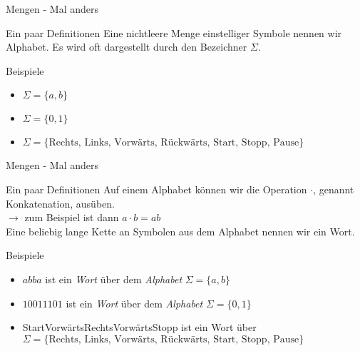 \begin{frame}{Mengen - Mal anders}
    \begin{alertblock}{Ein paar Definitionen}
    Eine nichtleere Menge einstelliger Symbole nennen wir \alert{Alphabet}.
    Es wird oft dargestellt durch den Bezeichner $\Sigma$.\\
    \end{alertblock}
    \begin{exampleblock}{Beispiele}
    \begin{itemize}
        \item $\Sigma = \{a,b\}$
        \item $\Sigma = \{0,1\}$
        \item $\Sigma = \{\text{Rechts, Links, Vorwärts, Rückwärts, Start, Stopp, Pause}\}$
    \end{itemize}
    \end{exampleblock}
\end{frame}

\begin{frame}[fragile]{Mengen - Mal anders}
    \begin{alertblock}{Ein paar Definitionen}
    Auf einem Alphabet können wir die Operation $\cdot$\;, genannt \alert{Konkatenation}, ausüben.\\
    $\rightarrow$ zum Beispiel ist dann $a \cdot b = ab$\\
    Eine beliebig lange Kette an Symbolen aus dem Alphabet nennen wir ein \alert{Wort}.
    \end{alertblock}
    \begin{exampleblock}{Beispiele}
    \begin{itemize}
        \item $abba$ ist ein \emph{Wort} über dem \emph{Alphabet} $\Sigma = \{a,b\}$
        \item $10011101$ ist ein \emph{Wort} über dem \emph{Alphabet} $\Sigma = \{0,1\}$
        \item StartVorwärtsRechtsVorwärtsStopp ist ein Wort über $\Sigma = \{\text{Rechts, Links, Vorwärts, Rückwärts, Start, Stopp, Pause}\}$
    \end{itemize}
    
    \end{exampleblock}
\end{frame}

